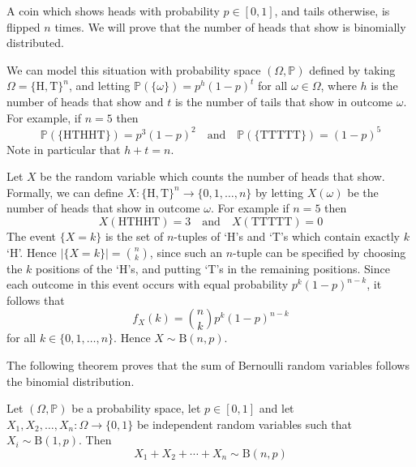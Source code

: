 \begin{example}
\label{exBinomialCoinFlip}
A coin which shows heads with probability $p \in [0,1]$, and tails otherwise, is flipped $n$ times. We will prove that the number of heads that show is binomially distributed.

We can model this situation with probability space $(\Omega,\mathbb{P})$ defined by taking $\Omega = \{\text{H},\text{T}\}^n$, and letting $\mathbb{P}(\{\omega\})=p^h(1-p)^t$ for all $\omega \in \Omega$, where $h$ is the number of heads that show and $t$ is the number of tails that show in outcome $\omega$. For example, if $n=5$ then
\[ \mathbb{P}(\{ \text{HTHHT} \}) = p^3(1-p)^2 \quad \text{and} \quad \mathbb{P}(\{ \text{TTTTT} \}) = (1-p)^5 \]
Note in particular that $h+t=n$.

Let $X$ be the random variable which counts the number of heads that show. Formally, we can define $X : \{\text{H},\text{T}\}^n \to \{0,1,\dots,n\}$ by letting $X(\omega)$ be the number of heads that show in outcome $\omega$. For example if $n=5$ then
\[ X(\text{HTHHT})=3 \quad \text{and} \quad X(\text{TTTTT})=0 \]
The event $\{ X = k \}$ is the set of $n$-tuples of `H's and `T's which contain exactly $k$ `H'. Hence $|\{X=k\}| = \binom{n}{k}$, since such an $n$-tuple can be specified by choosing the $k$ positions of the `H's, and putting `T's in the remaining positions. Since each outcome in this event occurs with equal probability $p^k(1-p)^{n-k}$, it follows that
\[ f_X(k) = \binom{n}{k} p^k (1-p)^{n-k} \]
for all $k \in \{ 0,1,\dots,n \}$. Hence $X \sim \mathrm{B}(n,p)$.
\end{example}

The following theorem proves that the sum of Bernoulli random variables follows the binomial distribution.

\begin{theorem}
\label{thmSumOfBernoulliIsBinomial}
Let $(\Omega,\mathbb{P})$ be a probability space, let $p \in [0,1]$ and let $X_1,X_2,\dots,X_n : \Omega \to \{ 0,1 \}$ be independent random variables such that $X_i \sim \mathrm{B}(1,p)$. Then
\[ X_1+X_2+\cdots+X_n \sim \mathrm{B}(n,p) \]
\end{theorem}

